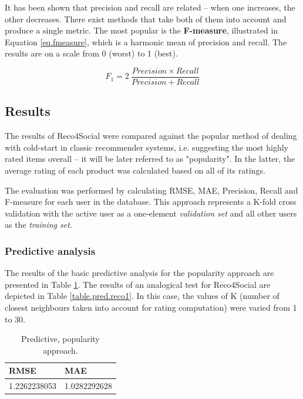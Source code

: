 \documentclass[12pt]{report}
\begin{document}
It has been shown that precision and recall are related -- when one increases, the other decreases. There exist methods that take both of them into account and produce a single metric. The most popular is the {\bf F-measure}, illustrated in Equation \ref{eq.fmeasure}, which is a harmonic mean of precision and recall. The results are on a scale from 0 (worst) to 1 (best).

\begin{equation}
F_1 = 2\:\frac{Precision \times Recall}{Precision + Recall}
\label{eq.fmeasure}
\end{equation}
\hbox{}

\subsection{Results}

The results of Reco4Social were compared against the popular method of dealing with cold-start in classic recommender systems, i.e. suggesting the most highly rated items overall -- it will be later referred to as "popularity". In the latter, the average rating of each product was calculated based on all of its ratings.

The evaluation was performed by calculating RMSE, MAE, Precision, Recall and F-measure for each user in the database. This approach represents a K-fold cross validation with the active user as a one-element \textit{validation set} and all other users as the \textit{training set}.

\subsubsection{Predictive analysis}

The results of the basic predictive analysis for the popularity approach are presented in Table \ref{table.pred.popularity1}. The results of an analogical test for Reco4Social are depicted in Table \ref{table.pred.reco1}. In this case, the values of K (number of closest neighbours taken into account for rating computation) were varied from 1 to 30.

\begin{table}[!h]
\centering
\caption{Predictive, popularity approach.}
\label{table.pred.popularity1}
\vspace{3mm}
\begin{tabular}{|l|l|}
\hline
{\bf RMSE}   & {\bf MAE}    \\ \hline
1.2262238053 & 1.0282292628 \\ \hline
\end{tabular}
\end{table}
\end{document}
